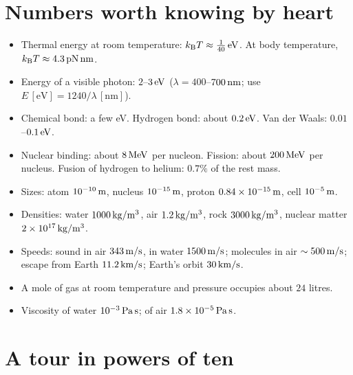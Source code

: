 \section*{Numbers worth knowing by heart}

\begin{itemize}[itemsep=3pt]
  \item Thermal energy at room temperature: $k_{\mathrm{B}} T\approx\tfrac1{40}\,\mathrm{eV}$. At body temperature, $k_{\mathrm{B}} T\approx4.3\,\mathrm{pN\,nm}$.
  \item Energy of a visible photon: $2$--$3\,\mathrm{eV}$ ($\lambda = 400$--$700\,\mathrm{nm}$; use $E\,[\mathrm{eV}] = 1240/\lambda\,[\mathrm{nm}]$).
  \item Chemical bond: a few eV. Hydrogen bond: about $0.2\,\mathrm{eV}$. Van der Waals: $0.01$--$0.1\,\mathrm{eV}$.
  \item Nuclear binding: about $8\,\mathrm{MeV}$ per nucleon. Fission: about $200\,\mathrm{MeV}$ per nucleus. Fusion of hydrogen to helium: $0.7\%$ of the rest mass.
  \item Sizes: atom $10^{-10}\,\mathrm{m}$, nucleus $10^{-15}\,\mathrm{m}$, proton $0.84\times10^{-15}\,\mathrm{m}$, cell $10^{-5}\,\mathrm{m}$.
  \item Densities: water $1000\,\mathrm{kg/m^3}$, air $1.2\,\mathrm{kg/m^3}$, rock $3000\,\mathrm{kg/m^3}$, nuclear matter $2\times10^{17}\,\mathrm{kg/m^3}$.
  \item Speeds: sound in air $343\,\mathrm{m/s}$, in water $1500\,\mathrm{m/s}$; molecules in air $\sim500\,\mathrm{m/s}$; escape from Earth $11.2\,\mathrm{km/s}$; Earth's orbit $30\,\mathrm{km/s}$.
  \item A mole of gas at room temperature and pressure occupies about $24$ litres.
  \item Viscosity of water $10^{-3}\,\mathrm{Pa\,s}$; of air $1.8\times10^{-5}\,\mathrm{Pa\,s}$.
\end{itemize}

\section*{A tour in powers of ten}

